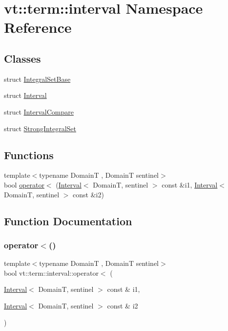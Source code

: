 \hypertarget{namespacevt_1_1term_1_1interval}{}\section{vt\+:\+:term\+:\+:interval Namespace Reference}
\label{namespacevt_1_1term_1_1interval}
\subsection*{Classes}
\begin{DoxyCompactItemize}
\item 
struct \hyperlink{structvt_1_1term_1_1interval_1_1_integral_set_base}{Integral\+Set\+Base}
\item 
struct \hyperlink{structvt_1_1term_1_1interval_1_1_interval}{Interval}
\item 
struct \hyperlink{structvt_1_1term_1_1interval_1_1_interval_compare}{Interval\+Compare}
\item 
struct \hyperlink{structvt_1_1term_1_1interval_1_1_strong_integral_set}{Strong\+Integral\+Set}
\end{DoxyCompactItemize}
\subsection*{Functions}
\begin{DoxyCompactItemize}
\item 
{\footnotesize template$<$typename DomainT , DomainT sentinel$>$ }\\bool \hyperlink{namespacevt_1_1term_1_1interval_a389d50e78b21fe2724432fcc75db6f4b}{operator$<$} (\hyperlink{structvt_1_1term_1_1interval_1_1_interval}{Interval}$<$ DomainT, sentinel $>$ const \&i1, \hyperlink{structvt_1_1term_1_1interval_1_1_interval}{Interval}$<$ DomainT, sentinel $>$ const \&i2)
\end{DoxyCompactItemize}


\subsection{Function Documentation}
\mbox{\label{namespacevt_1_1term_1_1interval_a389d50e78b21fe2724432fcc75db6f4b}} 
\subsubsection{\texorpdfstring{operator$<$()}{operator<()}}
{\footnotesize\ttfamily template$<$typename DomainT , DomainT sentinel$>$ \\
bool vt\+::term\+::interval\+::operator$<$ (\begin{DoxyParamCaption}\item[{\hyperlink{structvt_1_1term_1_1interval_1_1_interval}{Interval}$<$ DomainT, sentinel $>$ const \&}]{i1,  }\item[{\hyperlink{structvt_1_1term_1_1interval_1_1_interval}{Interval}$<$ DomainT, sentinel $>$ const \&}]{i2 }\end{DoxyParamCaption})}

